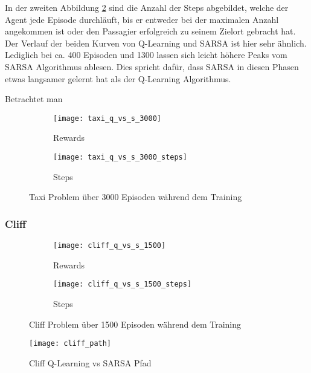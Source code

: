 In der zweiten Abbildung \ref{fig:taxi_step} sind die Anzahl der Steps abgebildet, welche der Agent jede Episode durchläuft, bis er entweder bei der maximalen Anzahl angekommen ist oder den Passagier erfolgreich zu seinem Zielort gebracht hat. Der Verlauf der beiden Kurven von Q-Learning und SARSA ist hier sehr ähnlich. Lediglich bei ca. 400 Episoden und 1300 lassen sich leicht höhere Peaks vom SARSA Algorithmus ablesen.
Dies spricht dafür, dass SARSA in diesen Phasen etwas langsamer gelernt hat als der Q-Learning Algorithmus.

Betrachtet man 

\begin{figure}[H]
    \centering
    \begin{subfigure}{.5\textwidth}
      \centering
      \texttt{[image: taxi\_q\_vs\_s\_3000]}
      \caption{Rewards}
      \label{fig:taxi_rew}
    \end{subfigure}%
    \begin{subfigure}{.5\textwidth}
      \centering
      \texttt{[image: taxi\_q\_vs\_s\_3000\_steps]}
      \caption{Steps}
      \label{fig:taxi_step}
    \end{subfigure}
    \caption{Taxi Problem über 3000 Episoden während dem Training}
    \label{fig:taxi_train}
\end{figure}

\subsubsection{Cliff}
\begin{figure}[H]
    \centering
    \begin{subfigure}{.5\textwidth}
      \centering
      \texttt{[image: cliff\_q\_vs\_s\_1500]}
      \caption{Rewards}
      \label{fig:cliff_rew}
    \end{subfigure}%
    \begin{subfigure}{.5\textwidth}
      \centering
      \texttt{[image: cliff\_q\_vs\_s\_1500\_steps]}
      \caption{Steps}
      \label{fig:cliff_step}
    \end{subfigure}
    \caption{Cliff Problem über 1500 Episoden während dem Training}
    \label{fig:cliff_train}
\end{figure}

\begin{figure}[H]
    \texttt{[image: cliff\_path]}
    \caption{Cliff Q-Learning vs SARSA Pfad}
    \label{fig:cliff_path}
\end{figure}

